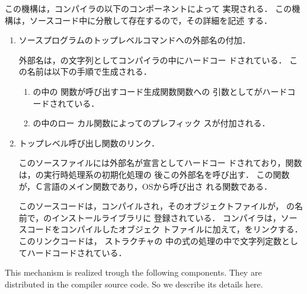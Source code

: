\ifjp%
	この機構は，\smlsharp{}コンパイラの以下のコンポーネントによって
実現される．
	この機構は，ソースコード中に分散して存在するので，その詳細を記述
する．
\begin{enumerate}
\item \smlsharp{}ソースプログラムのトップレベルコマンドへの外部名の付加．

	外部名は，の文字列としてコンパイラの中にハードコー
ドされている．
	この名前は以下の手順で生成される．
\begin{enumerate}
\item {}の中の
関数が呼び出すコード生成関数関数への
引数としてがハードコードされている．
\item {}の中のロー
カル関数によってのプレフィック
スが付加される．
\end{enumerate}

\item トップレベル呼び出し関数のリンク．

	このソースファイルには外部名が宣言としてハードコー
ドされており，関数は，\smlsharp{}の実行時処理系の初期化処理の
後この外部名を呼び出す．
	この関数が，Ｃ言語のメイン関数であり，OSから呼び出さ
れる関数である．

	このソースコードは，コンパイルされ，そのオブジェクトファイルが，
の名前で，\smlsharp{}のインストールライブラリに
登録されている．
	\smlsharp{}コンパイラは，ソースコードをコンパイルしたオブジェク
トファイルに加えて，をリンクする．
	このリンクコードは，
ストラクチャの
中の式の処理の中で文字列定数としてハードコードされている．
\end{enumerate}
\else%
	This mechanism is realized trough the following \smlsharp{}
components.
	They are distributed in the compiler source code.
	So we describe its details here.
